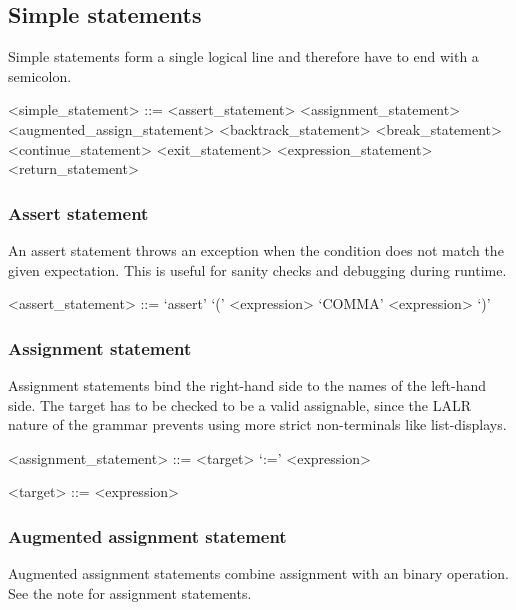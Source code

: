 %
\clearpage
%
\subsection{Simple statements}

Simple statements form a single logical line and therefore have to end with a semicolon.

\begin{grammar}
<simple_statement> ::= <assert_statement>
\alt <assignment_statement>
\alt <augmented_assign_statement>
\alt <backtrack_statement>
\alt <break_statement>
\alt <continue_statement>
\alt <exit_statement>
\alt <expression_statement>
\alt <return_statement>
\end{grammar}

%
\subsubsection{Assert statement}

An assert statement throws an exception when the condition does not match the given expectation. This is useful for sanity checks and debugging during runtime.

\begin{grammar}
<assert_statement> ::= `assert' `(' <expression> `COMMA' <expression> `)'
\end{grammar}

%
\subsubsection{Assignment statement}

Assignment statements bind the right-hand side to the names of the left-hand side. The target has to be checked to be a valid assignable, since the LALR nature of the grammar prevents using more strict non-terminals like list-displays.

\begin{grammar}
<assignment_statement> ::= <target> `:=' <expression>

<target> ::= <expression>
\end{grammar}

%
\subsubsection{Augmented assignment statement}

Augmented assignment statements combine assignment with an binary operation. See the note for assignment statements.


